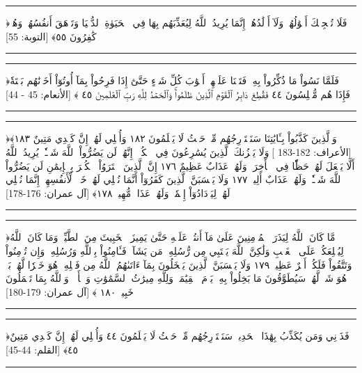 \documentclass[12pt,openany]{book}
\newenvironment{quranblock}
  {\par\medskip\begin{center}\begin{minipage}{0.92\linewidth}\centering\quranfont\large\color{ink}\hrule\vspace{0.65em}}
  {\vspace{0.65em}\hrule\end{minipage}\end{center}\medskip}
\begin{document}
\begin{quranblock}
﴿‌فَلَا ‌تُعۡجِبۡكَ أَمۡوَٰلُهُمۡ وَلَآ أَوۡلَٰدُهُمۡۚ إِنَّمَا يُرِيدُ ٱللَّهُ لِيُعَذِّبَهُم بِهَا فِي ٱلۡحَيَوٰةِ ٱلدُّنۡيَا وَتَزۡهَقَ أَنفُسُهُمۡ وَهُمۡ كَٰفِرُونَ ٥٥﴾ [التوبة: 55]
\end{quranblock}

\begin{quranblock}
﴿فَلَمَّا نَسُواْ مَا ذُكِّرُواْ بِهِۦ فَتَحۡنَا عَلَيۡهِمۡ أَبۡوَٰبَ كُلِّ شَيۡءٍ حَتَّىٰٓ إِذَا ‌فَرِحُواْ ‌بِمَآ ‌أُوتُوٓاْ أَخَذۡنَٰهُم بَغۡتَةٗ فَإِذَا هُم مُّبۡلِسُونَ ٤٤ فَقُطِعَ دَابِرُ ٱلۡقَوۡمِ ٱلَّذِينَ ظَلَمُواْۚ وَٱلۡحَمۡدُ لِلَّهِ رَبِّ ٱلۡعَٰلَمِينَ ٤٥ ﴾ [الأنعام: 45 - 44]
\end{quranblock}

\begin{quranblock}
﴿وَٱلَّذِينَ كَذَّبُواْ بِـَٔايَٰتِنَا ‌سَنَسۡتَدۡرِجُهُم مِّنۡ حَيۡثُ لَا يَعۡلَمُونَ ١٨٢ وَأُمۡلِي لَهُمۡۚ إِنَّ كَيۡدِي مَتِينٌ ١٨٣﴾ [الأعراف: 182-183 ]﴿وَلَا يَحۡزُنكَ ٱلَّذِينَ يُسَٰرِعُونَ فِي ٱلۡكُفۡرِۚ إِنَّهُمۡ لَن يَضُرُّواْ ٱللَّهَ شَيۡـٔٗاۚ يُرِيدُ ٱللَّهُ أَلَّا يَجۡعَلَ لَهُمۡ حَظّٗا فِي ٱلۡأٓخِرَةِۖ وَلَهُمۡ عَذَابٌ عَظِيمٌ ١٧٦ إِنَّ ٱلَّذِينَ ٱشۡتَرَوُاْ ٱلۡكُفۡرَ بِٱلۡإِيمَٰنِ لَن يَضُرُّواْ ٱللَّهَ شَيۡـٔٗاۖ وَلَهُمۡ عَذَابٌ أَلِيمٞ ١٧٧ وَلَا يَحۡسَبَنَّ ٱلَّذِينَ كَفَرُوٓاْ أَنَّمَا نُمۡلِي لَهُمۡ خَيۡرٞ لِّأَنفُسِهِمۡۚ إِنَّمَا نُمۡلِي لَهُمۡ لِيَزۡدَادُوٓاْ إِثۡمٗاۖ وَلَهُمۡ عَذَابٞ مُّهِينٞ ١٧٨﴾ [آل عمران: 176-178]
\end{quranblock}

\begin{quranblock}
﴿مَّا كَانَ ٱللَّهُ لِيَذَرَ ٱلۡمُؤۡمِنِينَ عَلَىٰ مَآ أَنتُمۡ عَلَيۡهِ حَتَّىٰ يَمِيزَ ٱلۡخَبِيثَ مِنَ ٱلطَّيِّبِۗ وَمَا كَانَ ٱللَّهُ لِيُطۡلِعَكُمۡ عَلَى ٱلۡغَيۡبِ وَلَٰكِنَّ ٱللَّهَ يَجۡتَبِي مِن رُّسُلِهِۦ مَن يَشَآءُۖ فَـَٔامِنُواْ بِٱللَّهِ وَرُسُلِهِۦۚ وَإِن تُؤۡمِنُواْ وَتَتَّقُواْ فَلَكُمۡ أَجۡرٌ عَظِيمٞ ١٧٩ وَلَا يَحۡسَبَنَّ ٱلَّذِينَ يَبۡخَلُونَ بِمَآ ءَاتَىٰهُمُ ٱللَّهُ مِن فَضۡلِهِۦ هُوَ خَيۡرٗا لَّهُمۖ بَلۡ هُوَ شَرّٞ لَّهُمۡۖ سَيُطَوَّقُونَ مَا بَخِلُواْ بِهِۦ يَوۡمَ ٱلۡقِيَٰمَةِۗ وَلِلَّهِ مِيرَٰثُ ٱلسَّمَٰوَٰتِ وَٱلۡأَرۡضِۗ وَٱللَّهُ بِمَا تَعۡمَلُونَ خَبِيرٞ ١٨٠ ﴾ [آل عمران: 179-180]
\end{quranblock}

\begin{quranblock}
﴿فَذَرۡنِي وَمَن يُكَذِّبُ بِهَٰذَا ٱلۡحَدِيثِۖ ‌سَنَسۡتَدۡرِجُهُم مِّنۡ حَيۡثُ لَا يَعۡلَمُونَ ٤٤ وَأُمۡلِي لَهُمۡۚ إِنَّ كَيۡدِي مَتِينٌ ٤٥﴾ [القلم: 44-45]
\end{quranblock}
\end{document}
